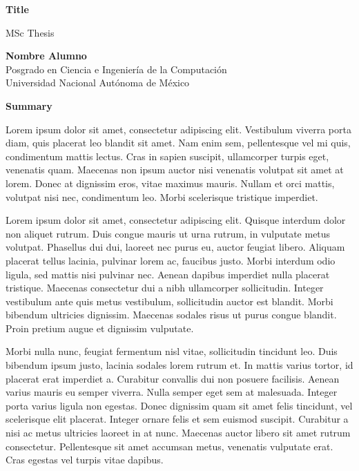 
\begin{center}
\large{\bf Title}

\normalsize{MSc Thesis}\\
\vspace{0.5cm}

\normalsize{\bf Nombre Alumno}\\
Posgrado en Ciencia e Ingeniería de la Computación\\
Universidad Nacional Autónoma de México

\vspace{1.0cm}

\large{\textbf{Summary\\}}

\end{center}
Lorem ipsum dolor sit amet, consectetur adipiscing elit. Vestibulum viverra porta diam, quis placerat leo blandit sit amet. Nam enim sem, pellentesque vel mi quis, condimentum mattis lectus. Cras in sapien suscipit, ullamcorper turpis eget, venenatis quam. Maecenas non ipsum auctor nisi venenatis volutpat sit amet at lorem. Donec at dignissim eros, vitae maximus mauris. Nullam et orci mattis, volutpat nisi nec, condimentum leo. Morbi scelerisque tristique imperdiet.

Lorem ipsum dolor sit amet, consectetur adipiscing elit. Quisque interdum dolor non aliquet rutrum. Duis congue mauris ut urna rutrum, in vulputate metus volutpat. Phasellus dui dui, laoreet nec purus eu, auctor feugiat libero. Aliquam placerat tellus lacinia, pulvinar lorem ac, faucibus justo. Morbi interdum odio ligula, sed mattis nisi pulvinar nec. Aenean dapibus imperdiet nulla placerat tristique. Maecenas consectetur dui a nibh ullamcorper sollicitudin. Integer vestibulum ante quis metus vestibulum, sollicitudin auctor est blandit. Morbi bibendum ultricies dignissim. Maecenas sodales risus ut purus congue blandit. Proin pretium augue et dignissim vulputate.

Morbi nulla nunc, feugiat fermentum nisl vitae, sollicitudin tincidunt leo. Duis bibendum ipsum justo, lacinia sodales lorem rutrum et. In mattis varius tortor, id placerat erat imperdiet a. Curabitur convallis dui non posuere facilisis. Aenean varius mauris eu semper viverra. Nulla semper eget sem at malesuada. Integer porta varius ligula non egestas. Donec dignissim quam sit amet felis tincidunt, vel scelerisque elit placerat. Integer ornare felis et sem euismod suscipit. Curabitur a nisi ac metus ultricies laoreet in at nunc. Maecenas auctor libero sit amet rutrum consectetur. Pellentesque sit amet accumsan metus, venenatis vulputate erat. Cras egestas vel turpis vitae dapibus.

